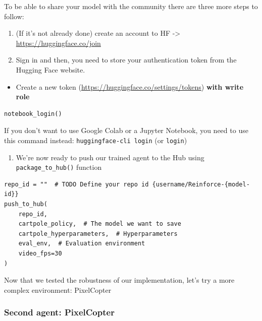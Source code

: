 \documentclass[11pt,a4paper]{article}
\begin{document}
To be able to share your model with the community there are three more steps to follow:

\begin{enumerate}
\def\labelenumi{\arabic{enumi}.}
\item
  (If it's not already done) create an account to HF -\textgreater{} \url{https://huggingface.co/join}
\item
  Sign in and then, you need to store your authentication token from the Hugging Face website.
\end{enumerate}

\begin{itemize}
\tightlist
\item
  Create a new token (\url{https://huggingface.co/settings/tokens}) \textbf{with write role}
\end{itemize}


\begin{lstlisting}
notebook_login()
\end{lstlisting}

If you don't want to use Google Colab or a Jupyter Notebook, you need to use this command instead: \texttt{huggingface-cli\ login} (or \texttt{login})

\begin{enumerate}
\def\labelenumi{\arabic{enumi}.}
\setcounter{enumi}{2}
\tightlist
\item
  We're now ready to push our trained agent to the Hub using \texttt{package\_to\_hub()} function
\end{enumerate}

\begin{lstlisting}
repo_id = ""  # TODO Define your repo id {username/Reinforce-{model-id}}
push_to_hub(
    repo_id,
    cartpole_policy,  # The model we want to save
    cartpole_hyperparameters,  # Hyperparameters
    eval_env,  # Evaluation environment
    video_fps=30
)
\end{lstlisting}

Now that we tested the robustness of our implementation, let's try a more complex environment: PixelCopter

\subsubsection{Second agent: PixelCopter}\label{second-agent-pixelcopter}
\end{document}
